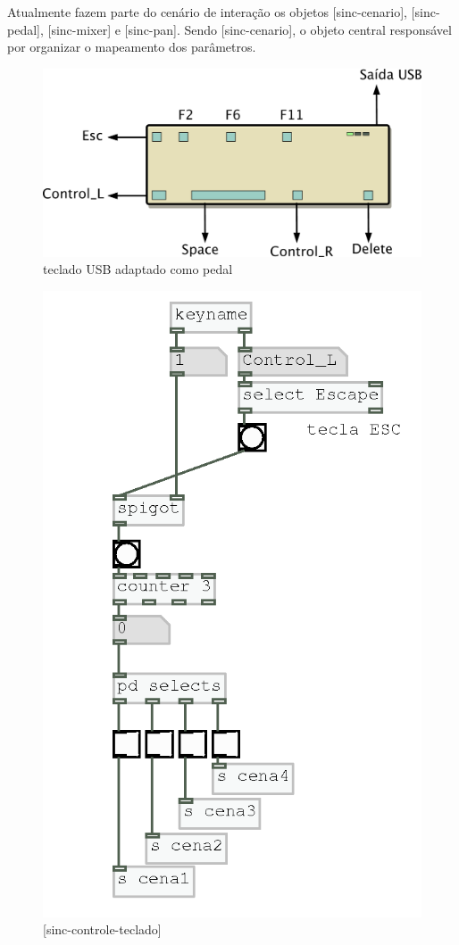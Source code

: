 \documentclass{ppgmus}
\begin{document}
Atualmente fazem parte do cenário de interação os objetos [sinc-cenario], [sinc-pedal],
[sinc-mixer] e [sinc-pan]. Sendo [sinc-cenario], o objeto central responsável
por organizar o mapeamento dos parâmetros.

\begin{figure}
\includegraphics[scale=.5]{teclado}
\caption{teclado USB adaptado como pedal}
\label{teclado}
\end{figure}

\begin{figure}
\includegraphics[scale=.7]{sinc-controle-teclado}
\caption{[sinc-controle-teclado]}
\label{sinc-controle-teclado}
\end{figure}
\end{document}

